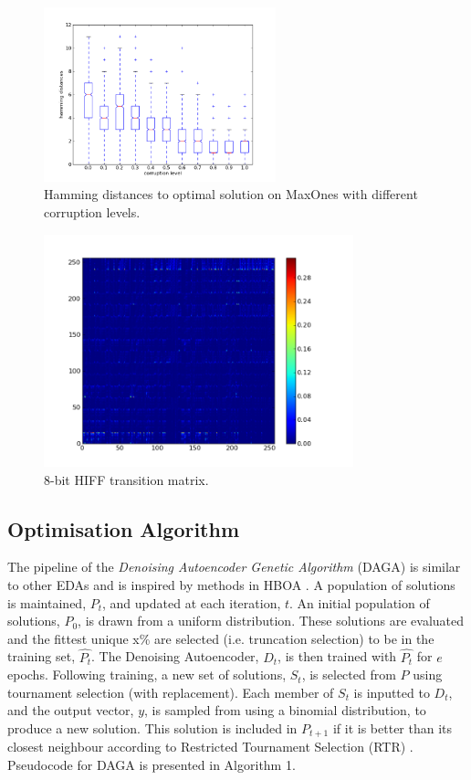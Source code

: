 \documentclass[runningheads,a4paper]{llncs}
\begin{document}
\begin{figure}[t!]
\center
\includegraphics[width = 0.6\textwidth]{images/boxplots_basins.png}

\caption{Hamming distances to optimal solution on MaxOnes with different corruption levels.}
\label{figure:8bithiff}
\end{figure}

\begin{figure}[t!]
\center
\includegraphics[width = 0.8\textwidth]{images/hiff-8-transition.png}

\caption{8-bit HIFF transition matrix.}
\label{figure:8bithiff}
\end{figure}

\subsection{Optimisation Algorithm}

The pipeline of the \emph{Denoising Autoencoder Genetic Algorithm} (DAGA) is similar to other EDAs and is inspired by methods in HBOA \cite{hboa}. A population of solutions is maintained, \(P_t\), and updated at each iteration, \(t\). An initial population of solutions, \(P_0\), is drawn from a uniform distribution. These solutions are evaluated and the fittest unique x\% are selected (i.e. truncation selection) to be in the training set, \(\hat{P_t}\). The Denoising Autoencoder, \(D_t\), is then trained with \(\hat{P_t}\) for \(e\) epochs. Following training, a new set of solutions, \(S_t\), is selected from \(P\) using tournament selection (with replacement). Each member of \(S_t\) is inputted to \(D_t\), and the output vector, \(y\), is sampled from using a binomial distribution, to produce a new solution. This solution is included in \(P_{t+1}\) if it is better than its closest neighbour according to Restricted Tournament Selection (RTR) \cite{hboa}. Pseudocode for DAGA is presented in Algorithm 1.
\end{document}
